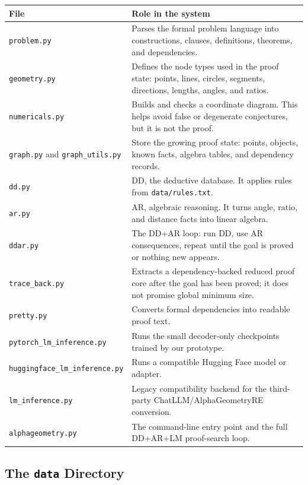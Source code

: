 \documentclass[reqno]{amsart}
\DeclareMathOperator{\1}{\textbf{1}}
\begin{document}
\begin{center}
\begin{tabular}{p{}p{}}
\textbf{File} & \textbf{Role in the system} \\
\hline
\texttt{problem.py} & Parses the formal problem language into constructions,
clauses, definitions, theorems, and dependencies. \\
\texttt{geometry.py} & Defines the node types used in the proof state:
points, lines, circles, segments, directions, lengths, angles, and ratios. \\
\texttt{numericals.py} & Builds and checks a coordinate diagram. This helps
avoid false or degenerate conjectures, but it is not the proof. \\
\texttt{graph.py} and \texttt{graph\_utils.py} & Store the growing proof
state: points, objects, known facts, algebra tables, and dependency records. \\
\texttt{dd.py} & DD, the deductive database. It applies rules from
\texttt{data/rules.txt}. \\
\texttt{ar.py} & AR, algebraic reasoning. It turns angle, ratio, and distance
facts into linear algebra. \\
\texttt{ddar.py} & The DD+AR loop: run DD, use AR consequences, repeat until
the goal is proved or nothing new appears. \\
\texttt{trace\_back.py} & Extracts a dependency-backed reduced proof core
after the goal has been proved; it does not promise global minimum size. \\
\texttt{pretty.py} & Converts formal dependencies into readable proof text. \\
\texttt{pytorch\_lm\_}\newline\texttt{inference.py} & Runs the small
decoder-only checkpoints trained by our prototype. \\
\texttt{huggingface\_lm\_}\newline\texttt{inference.py} & Runs a compatible
Hugging Face model or adapter. \\
\texttt{lm\_inference.py} & Legacy compatibility backend for the third-party
ChatLLM/AlphaGeometryRE conversion. \\
\texttt{alphageometry.py} & The command-line entry point and the full
DD+AR+LM proof-search loop. \\
\end{tabular}
\end{center}

\subsection{The \texttt{data} Directory}\label{sec: Data Directory}
\end{document}
